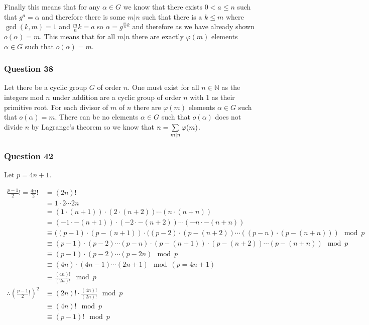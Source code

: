\documentclass{article}
\begin{document}
Finally this means that for any $\alpha \in G$ we know that there exists $0 < a \le n$ such that $g^a = \alpha$ and therefore there is some $m |n$ such that there is a $k\le m$ where $\gcd(k,m) = 1$ and $\frac mnk = a$ so $\alpha = g^{\frac mnk}$ and therefore as we have already shown $o(\alpha) = m$. This means that for all $m | n$ there are exactly $\varphi(m)$ elements $\alpha \in G$ such that $o(\alpha) = m$.

\subsubsection{Question 38}

Let there be a cyclic group $G$ of order $n$. One must exist for all $n \in\mathbb N$ as the integers mod $n$ under addition are a cyclic group of order $n$ with 1 as their primitive root. For each divisor of $m$ of $n$ there are $\varphi(m)$ elements $\alpha \in G$ such that $o(\alpha) = m$. There can be no elements $\alpha\in G$ such that $o(\alpha)$ does not divide $n$ by Lagrange's theorem so we know that $n = \sum\limits_{m|n}^{}  {\varphi(m)} $.

\subsubsection{Question 42}

Let $p = 4n+1$.

\begin{align*}
\frac{p-1}2! = \frac{4n}2! &= (2n)! \\
&= 1 \cdot 2 \cdots 2n \\
&= (1\cdot (n+1))\cdot (2\cdot(n+2)) \cdots (n\cdot(n+n))\\
&= (-1\cdot -(n+1)) \cdot (-2\cdot -(n+2)) \cdots (-n\cdot-(n+n))\\
&\equiv ((p-1)\cdot(p-(n+1)) \cdot ((p-2) \cdot (p-(n+2)) \cdots ((p-n) \cdot (p-(n+n))) \mod p \\
&\equiv (p - 1) \cdot (p - 2) \cdots (p - n) \cdot (p-(n+1)) \cdot (p - (n+2)) \cdots (p-(n+n)) \mod p \\
&\equiv (p-1) \cdot (p-2) \cdots (p-2n) \mod p \\
&\equiv (4n) \cdot (4n-1) \cdots (2n+1) \mod (p = 4n+1) \\
&\equiv \frac{(4n)!}{(2n)!} \mod p \\
\therefore \left(\frac{p-1}2!\right)^2 &\equiv (2n)! \cdot \frac{(4n)!}{(2n)!} \mod p \\
&\equiv (4n)! \mod p \\
&\equiv (p-1)! \mod p \\
\end{align*}
\end{document}
